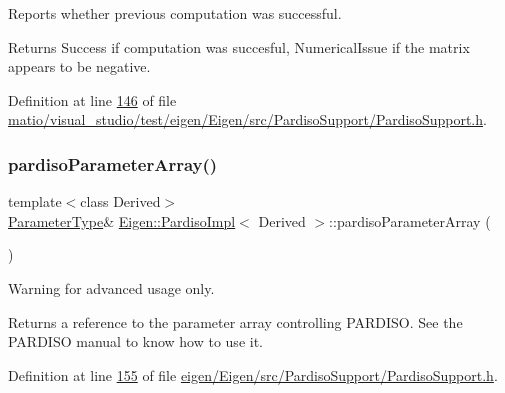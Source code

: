 Reports whether previous computation was successful. 

\begin{DoxyReturn}{Returns}
{\ttfamily Success} if computation was succesful, {\ttfamily Numerical\+Issue} if the matrix appears to be negative. 
\end{DoxyReturn}


Definition at line \hyperlink{matio_2visual__studio_2test_2eigen_2_eigen_2src_2_pardiso_support_2_pardiso_support_8h_source_l00146}{146} of file \hyperlink{matio_2visual__studio_2test_2eigen_2_eigen_2src_2_pardiso_support_2_pardiso_support_8h_source}{matio/visual\+\_\+studio/test/eigen/\+Eigen/src/\+Pardiso\+Support/\+Pardiso\+Support.\+h}.

\mbox{\label{class_eigen_1_1_pardiso_impl_a42a7983796076edc52e0e8d2869610ec}} 
\subsubsection{\texorpdfstring{pardiso\+Parameter\+Array()}{pardisoParameterArray()}\hspace{0.1cm}{\footnotesize\ttfamily [1/2]}}
{\footnotesize\ttfamily template$<$class Derived$>$ \\
\hyperlink{group___core___module}{Parameter\+Type}\& \hyperlink{class_eigen_1_1_pardiso_impl}{Eigen\+::\+Pardiso\+Impl}$<$ Derived $>$\+::pardiso\+Parameter\+Array (\begin{DoxyParamCaption}{ }\end{DoxyParamCaption})\hspace{0.3cm}{\ttfamily [inline]}}

\begin{DoxyWarning}{Warning}
for advanced usage only. 
\end{DoxyWarning}
\begin{DoxyReturn}{Returns}
a reference to the parameter array controlling P\+A\+R\+D\+I\+SO. See the P\+A\+R\+D\+I\+SO manual to know how to use it. 
\end{DoxyReturn}


Definition at line \hyperlink{eigen_2_eigen_2src_2_pardiso_support_2_pardiso_support_8h_source_l00155}{155} of file \hyperlink{eigen_2_eigen_2src_2_pardiso_support_2_pardiso_support_8h_source}{eigen/\+Eigen/src/\+Pardiso\+Support/\+Pardiso\+Support.\+h}.

